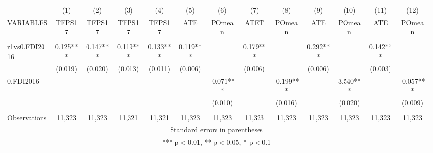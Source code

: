 \documentclass[]{article}
\begin{document}
\tiny
\begin{tabular}{lcccccccccccc} \hline
 & (1) & (2) & (3) & (4) & (5) & (6) & (7) & (8) & (9) & (10) & (11) & (12) \\
VARIABLES & TFPS17 & TFPS17 & TFPS17 & TFPS17 & ATE & POmean & ATET & POmean & ATE & POmean & ATE & POmean \\ \hline
 &  &  &  &  &  &  &  &  &  &  &  &  \\
r1vs0.FDI2016 & 0.125*** & 0.147*** & 0.119*** & 0.133*** & 0.119*** &  & 0.179*** &  & 0.292*** &  & 0.142*** &  \\
 & (0.019) & (0.020) & (0.013) & (0.011) & (0.006) &  & (0.006) &  & (0.006) &  & (0.003) &  \\
0.FDI2016 &  &  &  &  &  & -0.071*** &  & -0.199*** &  & 3.540*** &  & -0.057*** \\
 &  &  &  &  &  & (0.010) &  & (0.016) &  & (0.020) &  & (0.009) \\
 &  &  &  &  &  &  &  &  &  &  &  &  \\
 Observations & 11,323 & 11,323 & 11,321 & 11,321 & 11,323 & 11,323 & 11,323 & 11,323 & 11,323 & 11,323 & 11,323 & 11,323 \\ \hline
\multicolumn{13}{c}{ Standard errors in parentheses} \\
\multicolumn{13}{c}{ *** p$<$0.01, ** p$<$0.05, * p$<$0.1} \\
\end{tabular}
\end{document}
